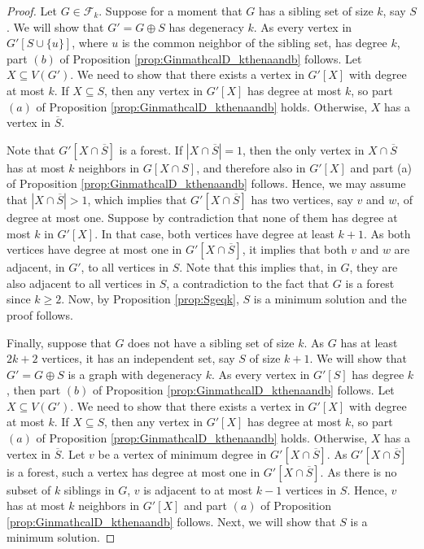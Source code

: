 \documentclass[10pt,a4paper]{amsart}
\begin{document}
\begin{proof}
Let $G \in \mathcal{F}_k$.
Suppose for a moment that $G$ has a sibling set of size $k$, say $S$.
We will show that $G'=G \oplus S$ has degeneracy $k$. As every vertex in $G'[S \cup \{u\}]$, where $u$
 is the common neighbor of the sibling set,
has degree $k$, part $(b)$ of Proposition \ref{prop:GinmathcalD_kthenaandb} follows.
Let $X \subseteq V(G')$. We need to show that there exists a vertex in $G'[X]$ with degree at most $k$.
If $X \subseteq S$, then any vertex in $G'[X]$ has degree at most $k$, so part $(a)$ of Proposition \ref{prop:GinmathcalD_kthenaandb} holds.
Otherwise, $X$ has a vertex in $\overline{S}$.

Note that $G'[X \cap \overline{S}]$ is a forest.
If $|X \cap \overline{S}|=1$, then the only vertex in
$X \cap \overline{S}$ has at most $k$ neighbors in $G[X \cap S]$, and therefore also in $G'[X]$ and part (a) of Proposition \ref{prop:GinmathcalD_kthenaandb} follows.  
Hence, we may assume that $|X \cap \overline{S}|>1$, which implies
that $G'[X \cap \overline{S}]$ has two vertices, say $v$ and $w$, of degree at most one.
Suppose by contradiction that none of them has degree at most $k$ in $G'[X]$. In that case, both vertices have degree at least $k+1$. As both vertices have degree at most one in $G'[X \cap \overline{S}]$, it implies that both $v$ and $w$ are adjacent, in $G'$, to all vertices in $S$.
Note that this implies that, in $G$, they are also adjacent to all vertices in $S$, a contradiction to the fact that $G$ is a forest since $k\geq 2$.
Now, by Proposition \ref{prop:Sgeqk}, $S$ is a minimum solution and the proof follows.


Finally, suppose that $G$ does not have a sibling set of size $k$. As $G$ has at least $2k+2$ vertices, it has an independent set, say $S$ of size $k+1$.
We will show that $G'=G \oplus S$ is a graph with degeneracy $k$. As every vertex in $G'[S]$ has degree $k$, then part $(b)$ of Proposition \ref{prop:GinmathcalD_kthenaandb} follows.
Let $X \subseteq V(G')$. We need to show that there exists a vertex in $G'[X]$ with degree at most $k$.
If $X \subseteq S$, then any vertex in $G'[X]$ has degree at most $k$, so part $(a)$ of Proposition \ref{prop:GinmathcalD_kthenaandb} holds.
Otherwise, $X$ has a vertex in $\overline{S}$.
Let $v$ be a vertex of minimum degree in $G'[X \cap \overline{S}]$. As $G'[X \cap \overline{S}]$ is a forest, such a vertex has degree at most one in
$G'[X \cap \overline{S}]$.
As there is no subset of $k$ siblings in $G$,
$v$ is adjacent to at most $k-1$ vertices in $S$.
Hence, $v$ has at most $k$ neighbors in $G'[X]$ and part $(a)$ of Proposition \ref{prop:GinmathcalD_kthenaandb} follows.
Next, we will show that $S$ is a minimum solution.


\end{proof}
\end{document}
